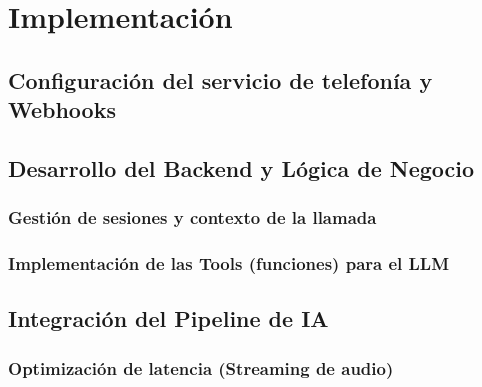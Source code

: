 \chapter{\textbf{Implementación}}
\label{ch:Implementacion}
\thispagestyle{fancy}

\section{Configuración del servicio de telefonía y Webhooks}
\label{sec:config_telefonia_webhooks}

\textoBase


\section{Desarrollo del Backend y Lógica de Negocio}
\label{sec:backend_logica_negocio}

\textoBaseAlt

\subsection{Gestión de sesiones y contexto de la llamada}
\label{subsec:sesiones_contexto}

\textoBase

\subsection{Implementación de las Tools (funciones) para el LLM}
\label{subsec:tools_llm}

\textoBaseAlt

\section{Integración del Pipeline de IA}
\label{sec:integracion_pipeline_ia}

\textoBase


\subsection{Optimización de latencia (Streaming de audio)}
\label{subsec:optimizacion_latencia}

\textoBaseAlt

